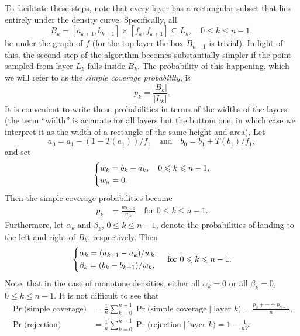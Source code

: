 \documentclass{article}
\renewcommand{\leq}{\leqslant}
\theoremstyle{definition} %
\begin{document}
To facilitate these steps, note that every layer has a rectangular subset that lies entirely under the density curve. Specifically, all
\[
    B_k = [a_{k + 1} , b_{k + 1}] \times [f_k, f_{k + 1}] \subseteq L_k, \quad 0 \leq k \leq n - 1,
\]
lie under the graph of $f$ (for the top layer the box $B_{n - 1}$ is trivial).
In light of this, the second step of the algorithm becomes substantially simpler if the point sampled from layer $L_k$ falls inside $B_k$. The probability of this happening, which we will refer to as the \emph{simple coverage probability}, is
\[
    p_k = \frac{|B_k|}{|L_k|}.
\]
It is convenient to write these probabilities in terms of the widths of the layers (the term ``width'' is accurate for all layers but the bottom one, in which case we interpret it as the width of a rectangle of the same height and area). Let
\[
    a_0 = a_1 - (1 - T(a_1)) / f_1
    \quad \text{and} \quad
    b_0 = b_1 + T(b_1) / f_1,
\]
and set
\begin{align} \label{eq:layer_width}
    \begin{dcases}
        w_k = b_k - a_k, \quad 0 \leq k \leq n - 1, \\
        w_n = 0.
    \end{dcases}
\end{align}
Then the simple coverage probabilities become
\begin{align} \label{eq:simple_coverage_probability}
    p_k &= \frac{w_{k + 1}}{w_{k}} \quad \text{for $0 \leq k \leq n - 1$}.
\end{align}
%
Furthermore, let $\alpha _k$ and $\beta _k$, $0 \leq k \leq n - 1$, denote the probabilities of landing to the left and right of $B_k$, respectively. Then
\begin{align} \label{eq:fallout_probability}
    \begin{dcases}
        \alpha _k = (a_{k + 1} - a_{k}) / w_k, \\
        \beta _k = (b_{k} - b_{k + 1}) / w_k,
    \end{dcases}
    \quad \text{for $0 \leq k \leq n - 1$}.
\end{align}
Note, that in the case of monotone densities, either all $\alpha _k = 0$ or all $\beta _k = 0$, $0 \leq k \leq n - 1$.
%
It is not difficult to see that
\begin{align*}
    \Pr \big(\text{simple coverage}\big) &= \frac{1}{n} \sum _{k = 0} ^{n - 1} \Pr \big(\text{simple coverage} \mid \text{layer $k$}\big)
        = \frac{p_0 + \cdots + p_{n - 1}}{n}, \\
    \Pr \big(\text{rejection}\big) &= \frac{1}{n} \sum _{k = 0} ^{n - 1} \Pr \big(\text{rejection} \mid \text{layer $k$}\big)
        = 1 - \frac{1}{n V}.
\end{align*}
\end{document}
